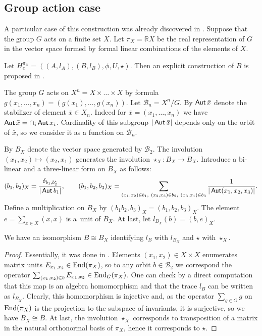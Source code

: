 \documentclass[pdftex]{sigma}
\newcommand{\Aut}{\mathop{\sf Aut}\nolimits}
\def \ens {{\rm End}}
\begin{document}
\subsection{Group action case}
A particular case of this construction was already discovered in
\cite{AN3}.
Suppose that the group $G$ acts on a f\/inite set $X$. Let $\pi_X = {\mathbb R} X $ be
the real representation of $G$ in the vector space formed by formal
linear combinations of the elements of $X$.

Let $H^{\pi_X}_e = ((A,l_A),(B,l_B),\phi,U,\star)$. Then
an explicit construction of $B$ is proposed in \cite{AN3}.

The group $G$ acts on $X^n=X\times \dots \times X$ by formula
$g(x_1,\dots,x_n)= (g(x_1),\dots,g(x_n))$.  Let
$\mathcal{B}_n=X^n/G$. By $\Aut\bar x$
denote the
stabilizer of element $\bar x \in X_n$.
Indeed for $\bar x=(x_1,\dots,x_n)$ we have
$\Aut\bar x =\cap_i\Aut x_i$.
Cardinality of this subgroup $|\Aut\bar x|$ depends only on
the orbit of $\bar x$, so we consider it as a function on
$\mathcal{B}_n$.


By $B_X$ denote  the vector space generated by $\mathcal{B}_2$. The
involution $(x_1,x_2)\mapsto(x_2,x_1)$ generates the involution
$\star_X :B_X\rightarrow B_X$. Introduce a bi-linear and a three-linear
form on $B_X$ as follows:
\[
(b_1,b_2)_X = \frac{\delta_{b_1,b_2^\star}}{|\Aut b_1|},
\qquad
(b_1,b_2,b_3)_X = \sum_{(x_1,x_2) \in b_1,\ (x_2,x_3) \in b_2, \ (x_3,x_1) \in b_3}
\frac{1}{|\Aut (x_1,x_2,x_3)|}.
\]
Def\/ine a multiplication on $B_X$ by $(b_1b_2,b_3)_X=
(b_1,b_2,b_3)_X$. The element $e = \sum_{x\in X} (x,x)$ is a~unit of $B_X$.
At last, let  $l_{B_X}(b)=(b,e)_X$.



\begin{theorem}
We have an isomorphism $B \cong B_X$ identifying  $l_B$ with  $l_{B_X}$ and
$\star$ with $\star_X$.
\end{theorem}

\begin{proof}
Essentially, it was done in \cite{AN3}. Elements $(x_1,x_2) \in X\times X$
enumerates matrix units $E_{x_1,x_2} \in \ens(\pi_X)$, so to any orbit
$b\in\mathcal{B}_2$
we correspond the operator $\sum_{(x_1,x_2) \in b} E_{x_1,x_2} \in \ens_G(\pi_X)$.
One can check by a direct computation that this map is an algebra homomorphism and that
the trace $l_B$ can be written as  $l_{B_X}$.
Clearly, this homomorphism is injective and, as the operator $\sum_{g \in G} g$ on  $\ens(\pi_X)$
 is the projection to the subspace of invariants, it is surjective,
so we have $B_X \cong B$.
At last, the involution $\star_X$ corresponds to transposition of a matrix in
the natural orthonormal basis of $\pi_X$, hence it corresponds to $\star$.
\end{proof}
\end{document}
